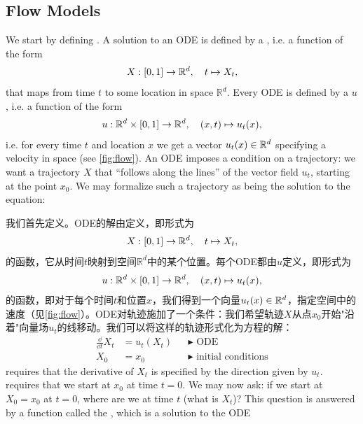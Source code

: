\subsection{Flow Models}

We start by defining . A solution to an ODE is defined by a , i.e. a function of the form
\begin{align*}
X: [0,1] \to \mathbb{R}^d, \quad t \mapsto X_t,
\end{align*}
that maps from time $t$ to some location in space $\mathbb{R}^d$. Every ODE is defined by a  $u$, i.e. a function of the form
\begin{align*}
u:\mathbb{R}^d\times [0,1]\to \mathbb{R}^d,\quad (x,t)\mapsto u_t(x),
\end{align*}
i.e. for every time $t$ and location $x$ we get a vector $u_t(x)\in\mathbb{R}^d$ specifying a velocity in space (see  \cref{fig:flow}). An ODE imposes a condition on a trajectory: we want a trajectory $X$ that ``follows along the lines'' of the vector field $u_t$, starting at the point $x_0$. We may formalize such a trajectory as being the solution to the equation:

我们首先定义。ODE的解由定义，即形式为
\begin{align*}
X: [0,1] \to \mathbb{R}^d, \quad t \mapsto X_t,
\end{align*}
的函数，它从时间$t$映射到空间$\mathbb{R}^d$中的某个位置。每个ODE都由$u$定义，即形式为
\begin{align*}
u:\mathbb{R}^d\times [0,1]\to \mathbb{R}^d,\quad (x,t)\mapsto u_t(x),
\end{align*}
的函数，即对于每个时间$t$和位置$x$，我们得到一个向量$u_t(x)\in\mathbb{R}^d$，指定空间中的速度（见\cref{fig:flow}）。ODE对轨迹施加了一个条件：我们希望轨迹$X$从点$x_0$开始"沿着"向量场$u_t$的线移动。我们可以将这样的轨迹形式化为方程的解：
\begin{subequations}
    \begin{align} 
      \frac{\dd}{\dd t}X_{t} &= u_t(X_t) &&\blacktriangleright\,\,\text{ODE}\label{e:ode_ode}\\
      X_0&= x_0            &&\blacktriangleright\,\,\text{initial conditions}\label{e:ODE_boundary} 
    \end{align}
\end{subequations}
 requires that the derivative of $X_t$ is specified by the direction given by $u_t$.  requires that we start at $x_0$ at time $t=0$. We may now ask: if we start at $X_0 = x_0$ at $t=0$, where are we at time $t$ (what is $X_t$)? This question is answered by a function called the , which is a solution to the ODE

